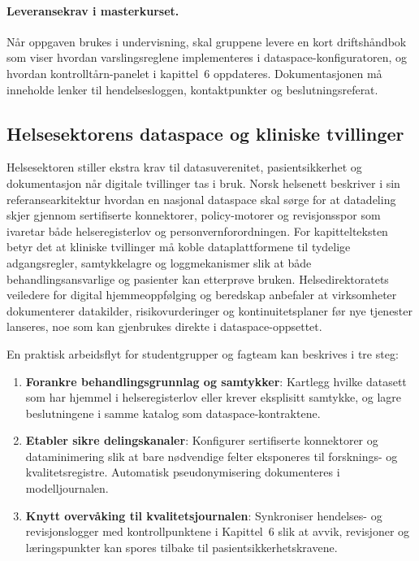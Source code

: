 \paragraph{Leveransekrav i masterkurset.} Når oppgaven brukes i undervisning, skal gruppene levere en kort driftshåndbok som
viser hvordan varslingsreglene implementeres i dataspace-konfiguratoren, og hvordan kontrolltårn-panelet i kapittel~6
oppdateres. Dokumentasjonen må inneholde lenker til hendelsesloggen, kontaktpunkter og beslutningsreferat.

\subsection{Helsesektorens dataspace og kliniske tvillinger}
Helsesektoren stiller ekstra krav til datasuverenitet, pasientsikkerhet og dokumentasjon når digitale tvillinger tas i bruk.
Norsk helsenett beskriver i sin referansearkitektur hvordan en nasjonal dataspace skal sørge for at datadeling skjer gjennom
sertifiserte konnektorer, policy-motorer og revisjonsspor som ivaretar både helseregisterlov og personvernforordningen.\citep{nhn2024dataspace}
For kapittelteksten betyr det at kliniske tvillinger må koble dataplattformene til tydelige adgangsregler, samtykkelagre og
loggmekanismer slik at både behandlingsansvarlige og pasienter kan etterprøve bruken. Helsedirektoratets veiledere for digital
hjemmeoppfølging og beredskap anbefaler at virksomheter dokumenterer datakilder, risikovurderinger og kontinuitetsplaner før
nye tjenester lanseres, noe som kan gjenbrukes direkte i dataspace-oppsettet.\citep{helsedir2020dho,helsedir2023beredskap}

En praktisk arbeidsflyt for studentgrupper og fagteam kan beskrives i tre steg:
\begin{enumerate}
    \item \textbf{Forankre behandlingsgrunnlag og samtykker}: Kartlegg hvilke datasett som har hjemmel i helseregisterlov eller krever eksplisitt samtykke, og lagre beslutningene i samme katalog som dataspace-kontraktene.
    \item \textbf{Etabler sikre delingskanaler}: Konfigurer sertifiserte konnektorer og dataminimering slik at bare nødvendige felter eksponeres til forsknings- og kvalitetsregistre. Automatisk pseudonymisering dokumenteres i modelljournalen.\citep{datatilsynet2023dpia}
    \item \textbf{Knytt overvåking til kvalitetsjournalen}: Synkroniser hendelses- og revisjonslogger med kontrollpunktene i Kapittel~6 slik at avvik, revisjoner og læringspunkter kan spores tilbake til pasientsikkerhetskravene.\citep{ehelse2024tilsyn}
\end{enumerate}

